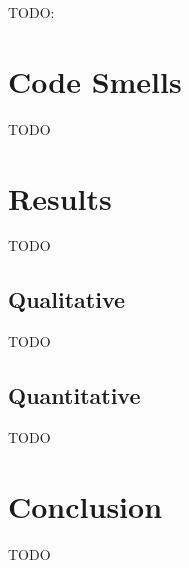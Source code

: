 \documentclass[conference]{IEEEtran}
\begin{document}
\label{results}
TODO:

\section{Code Smells}
\label{discussion}
TODO

\section{Results}
\label{threats}
TODO

\subsection{Qualitative}
TODO
\subsection{Quantitative}
TODO

\section{Conclusion}
\label{conclusion}
TODO





\balance
\end{document}
